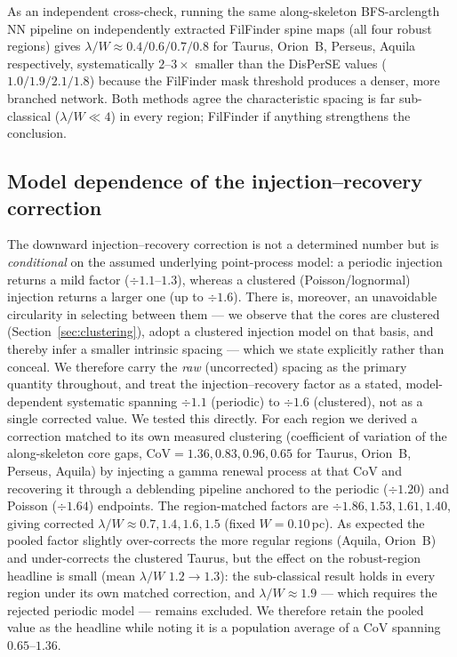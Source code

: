 \documentclass[usenatbib,twoside,twocolumn]{mnras}
\begin{document}
As an independent cross-check, running the same along-skeleton BFS-arclength NN pipeline on independently extracted FilFinder spine maps (all four robust regions) gives $\lambda/W\approx0.4/0.6/0.7/0.8$ for Taurus, Orion~B, Perseus, Aquila respectively, systematically $2$--$3\times$ smaller than the DisPerSE values ($1.0/1.9/2.1/1.8$) because the FilFinder mask threshold produces a denser, more branched network. Both methods agree the characteristic spacing is far sub-classical ($\lambda/W\ll4$) in every region; FilFinder if anything strengthens the conclusion.

\subsection{Model dependence of the injection--recovery correction}
The downward injection--recovery correction is not a determined number but is \emph{conditional} on the assumed underlying point-process model: a periodic injection returns a mild factor ($\div1.1$--$1.3$), whereas a clustered (Poisson/lognormal) injection returns a larger one (up to $\div1.6$). There is, moreover, an unavoidable circularity in selecting between them --- we observe that the cores are clustered (Section~\ref{sec:clustering}), adopt a clustered injection model on that basis, and thereby infer a smaller intrinsic spacing --- which we state explicitly rather than conceal. We therefore carry the \emph{raw} (uncorrected) spacing as the primary quantity throughout, and treat the injection--recovery factor as a stated, model-dependent systematic spanning $\div1.1$ (periodic) to $\div1.6$ (clustered), not as a single corrected value. We tested this directly. For each region we derived a correction matched to its own measured clustering (coefficient of variation of the along-skeleton core gaps, CoV$=1.36,0.83,0.96,0.65$ for Taurus, Orion~B, Perseus, Aquila) by injecting a gamma renewal process at that CoV and recovering it through a deblending pipeline anchored to the periodic ($\div1.20$) and Poisson ($\div1.64$) endpoints. The region-matched factors are $\div1.86,1.53,1.61,1.40$, giving corrected $\lambda/W\approx0.7,1.4,1.6,1.5$ (fixed $W=0.10$\,pc). As expected the pooled factor slightly over-corrects the more regular regions (Aquila, Orion~B) and under-corrects the clustered Taurus, but the effect on the robust-region headline is small (mean $\lambda/W$ $1.2\to1.3$): the sub-classical result holds in every region under its own matched correction, and $\lambda/W\approx1.9$ --- which requires the rejected periodic model --- remains excluded. We therefore retain the pooled value as the headline while noting it is a population average of a CoV spanning $0.65$--$1.36$.
\end{document}
